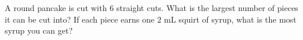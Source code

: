 A round pancake is cut with $6$ straight cuts. What is the largest number of pieces it can be cut into? If each piece earns one $2$ mL squirt of syrup, what is the most syrup you can get?
